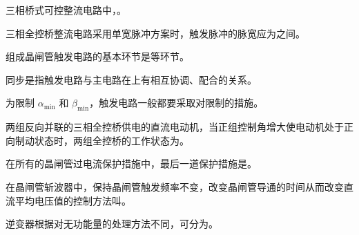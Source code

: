 \documentclass[电力电子]{subfiles}
\begin{document}
\begin{ti}
	三相桥式可控整流电路中，。
\end{ti}

\begin{ti}
	三相全控桥整流电路采用单宽脉冲方案时，触发脉冲的脉宽应为之间。
\end{ti}

\begin{ti}
	组成晶闸管触发电路的基本环节是等环节。
\end{ti}

\begin{ti}
	同步是指触发电路与主电路在上有相互协调、配合的关系。
\end{ti}

\begin{ti}
	为限制 $\alpha_{\min}$ 和 $\beta_{\min}$，触发电路一般都要采取对限制的措施。
\end{ti}

\begin{ti}
	两组反向并联的三相全控桥供电的直流电动机，当正组控制角增大使电动机处于正向制动状态时，两组全控桥的工作状态为。
\end{ti}

\begin{ti}
	在所有的晶闸管过电流保护措施中，最后一道保护措施是。
\end{ti}

\begin{ti}
	在晶闸管斩波器中，保持晶闸管触发频率不变，改变晶闸管导通的时间从而改变直流平均电压值的控制方法叫。
\end{ti}

\begin{ti}
	逆变器根据对无功能量的处理方法不同，可分为。
\end{ti}
\end{document}

